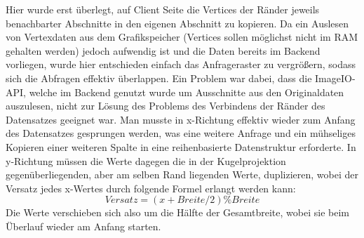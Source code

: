 Hier wurde erst überlegt, auf Client Seite die Vertices der Ränder jeweils benachbarter Abschnitte in den eigenen Abschnitt zu kopieren. Da ein Auslesen von Vertexdaten aus dem Grafikspeicher (Vertices sollen möglichst nicht im RAM gehalten werden) jedoch aufwendig ist und die Daten bereits im Backend vorliegen, wurde hier entschieden einfach das Anfrageraster zu vergrößern, sodass sich die Abfragen effektiv überlappen. Ein Problem war dabei, dass die ImageIO-API, welche im Backend genutzt wurde um Ausschnitte aus den Originaldaten auszulesen, nicht zur Lösung des Problems des Verbindens der Ränder des Datensatzes geeignet war. Man musste in x-Richtung effektiv wieder zum Anfang des Datensatzes gesprungen werden, was eine weitere Anfrage und ein mühseliges Kopieren einer weiteren Spalte in eine reihenbasierte Datenstruktur erforderte. In y-Richtung müssen die Werte dagegen die in der Kugelprojektion gegenüberliegenden, aber am selben Rand liegenden Werte, duplizieren, wobei der Versatz jedes x-Wertes durch folgende Formel erlangt werden kann: \[Versatz = (x + Breite / 2) \% Breite\] Die Werte verschieben sich also um die Hälfte der Gesamtbreite, wobei sie beim Überlauf wieder am Anfang starten.

